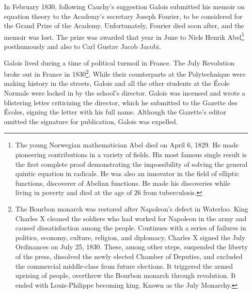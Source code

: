 \documentclass[b5paper]{article}
\begin{document}
In February 1830, following Cauchy's suggestion Galois submitted his memoir on equation theory to the Academy's secretary Joseph Fourier, to be considered for the Grand Prize of the Academy. Unfortunately, Fourier died soon after, and the memoir was lost. The prize was awarded that year in June to Niels Henrik Abel\footnote{The young Norwegian mathematician Abel died on April 6, 1829. He made pioneering contributions in a variety of fields. His most famous single result is the first complete proof demonstrating the impossibility of solving the general quintic equation in radicals. He was also an innovator in the field of elliptic functions, discoverer of Abelian functions. He made his discoveries while living in poverty and died at the age of 26 from tuberculosis.} posthumously and also to Carl Gustav Jacob Jacobi\cite{HanXueTao2009}.

Galois lived during a time of political turmoil in France. The July Revolution broke out in France in 1830\footnote{The Bourbon monarch was restored after Napoleon's defect in Waterloo. King Charles X cleaned the soldiers who had worked for Napoleon in the army and caused dissatisfaction among the people. Continues with a series of failures in politics, economy, culture, religion, and diplomacy, Charles X signed the July Ordinances on July 25, 1830. These, among other steps, suspended the liberty of the press, dissolved the newly elected Chamber of Deputies, and excluded the commercial middle-class from future elections. It triggered the armed uprising of people, overthrew the Bourbon monarch through revolution. It ended with Louis-Philippe becoming king. Known as the July Monarchy.}. While their counterparts at the Polytechnique were making history in the streets, Galois and all the other students at the École Normale were locked in by the school's director. Galois was incensed and wrote a blistering letter criticizing the director, which he submitted to the Gazette des Écoles, signing the letter with his full name. Although the Gazette's editor omitted the signature for publication, Galois was expelled.
\end{document}
